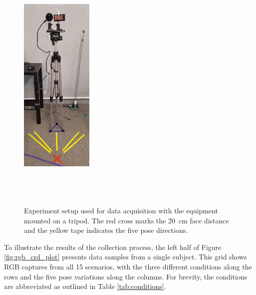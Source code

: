 \documentclass{mpaper}
\begin{document}
\begin{figure}[h!]
    \centering
    \includegraphics[width=0.31\textwidth, height=12.5cm]{figures/experiment_setup.pdf}
    \vspace{0.2cm}
    \caption{Experiment setup used for data acquisition with the equipment mounted on a tripod. The red cross marks the \qty{20}{\cm} face distance and the yellow tape indicates the five pose directions.}
    \label{fig:experiment_setup}
\end{figure}


To illustrate the results of the collection process, the left half of Figure \ref{fig:rgb_crd_plot} presents data samples from a single subject. This grid shows RGB captures from all 15 scenarios, with the three different conditions along the rows and the five pose variations along the columns. For brevity, the conditions are abbreviated as outlined in Table \ref{tab:conditions}.

\begin{table}[h!]
    \centering
    \vspace{0.1cm}
    \caption{Table displaying full forms for abbreviations describing experiment conditions.}
    \label{tab:conditions}
\end{table}
\end{document}
